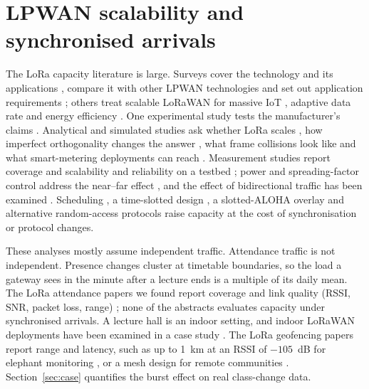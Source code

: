 \documentclass[12pt]{article}
\let\cite\citep
\begin{document}
\section{LPWAN scalability and synchronised arrivals}\label{sec:lpwan}
The LoRa capacity literature is large. Surveys cover the technology and its applications \cite{haxhibeqiri2018survey,sinha2017survey}, compare it with other LPWAN technologies \cite{mekki2019comparative} and set out application requirements \cite{chaudhari2020lpwan}; others treat scalable LoRaWAN for massive IoT \cite{jouhari2023survey}, adaptive data rate \cite{kufakunesu2020survey} and energy efficiency \cite{cheikh2022multi,banti2022lorawan}. One experimental study tests the manufacturer's claims \cite{liando2019known}. Analytical and simulated studies ask whether LoRa scales \cite{bor2016scale,georgiou2017scale,adelantado2017limits,haxhibeqiri2017sim}, how imperfect orthogonality changes the answer \cite{mahmood2019scalability,croce2018impact}, what frame collisions look like \cite{rahmadhani2018collide} and what smart-metering deployments can reach \cite{varsier2017capacity}. Measurement studies report coverage and scalability \cite{petjjrvi2017performance,sancheziborra2018performance} and reliability on a testbed \cite{cattani2017experimental}; power and spreading-factor control address the near--far effect \cite{reynders2017power}, and the effect of bidirectional traffic has been examined \cite{pop2017does}. Scheduling \cite{reynders2018scheduling,haxhibeqiri2019overhead}, a time-slotted design \cite{zorbas2020lora}, a slotted-ALOHA overlay \cite{polonelli2019slotted} and alternative random-access protocols \cite{beltramelli2021lora} raise capacity at the cost of synchronisation or protocol changes.

These analyses mostly assume independent traffic. Attendance traffic is not independent. Presence changes cluster at timetable boundaries, so the load a gateway sees in the minute after a lecture ends is a multiple of its daily mean. The LoRa attendance papers we found report coverage and link quality (RSSI, SNR, packet loss, range) \cite{noprianto2023application,khurshid2025fusion}; none of the abstracts evaluates capacity under synchronised arrivals. A lecture hall is an indoor setting, and indoor LoRaWAN deployments have been examined in a case study \cite{neumann2016indoor}. The LoRa geofencing papers report range and latency, such as up to 1~km at an RSSI of $-105$~dB for elephant monitoring \cite{andika2026lora}, or a mesh design for remote communities \cite{ahmed2024scalable}. Section~\ref{sec:case} quantifies the burst effect on real class-change data.
\end{document}
